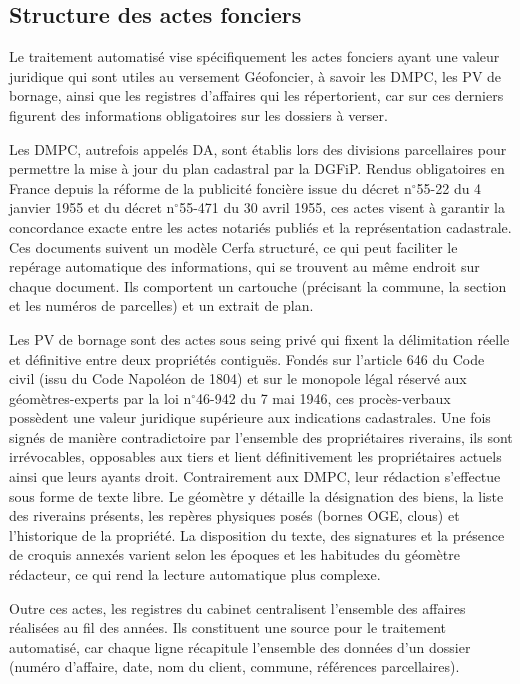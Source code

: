 \subsection{Structure des actes fonciers}

Le traitement automatisé vise spécifiquement les actes fonciers ayant une valeur juridique qui sont utiles au versement Géofoncier, à savoir les DMPC, les PV de bornage, ainsi que les registres d'affaires qui les répertorient, car sur ces derniers figurent des informations obligatoires sur les dossiers à verser.

Les DMPC, autrefois appelés DA, sont établis lors des divisions parcellaires pour permettre la mise à jour du plan cadastral par la DGFiP. Rendus obligatoires en France depuis la réforme de la publicité foncière issue du décret n$^\circ$55-22 du 4 janvier 1955 et du décret n$^\circ$55-471 du 30 avril 1955, ces actes visent à garantir la concordance exacte entre les actes notariés publiés et la représentation cadastrale. Ces documents suivent un modèle Cerfa structuré, ce qui peut faciliter le repérage automatique des informations, qui se trouvent au même endroit sur chaque document. Ils comportent un cartouche (précisant la commune, la section et les numéros de parcelles) et un extrait de plan. 

Les PV de bornage sont des actes sous seing privé qui fixent la délimitation réelle et définitive entre deux propriétés contiguës. Fondés sur l'article 646 du Code civil (issu du Code Napoléon de 1804) et sur le monopole légal réservé aux géomètres-experts par la loi n$^\circ$46-942 du 7 mai 1946, ces procès-verbaux possèdent une valeur juridique supérieure aux indications cadastrales. Une fois signés de manière contradictoire par l'ensemble des propriétaires riverains, ils sont irrévocables, opposables aux tiers et lient définitivement les propriétaires actuels ainsi que leurs ayants droit. Contrairement aux DMPC, leur rédaction s'effectue sous forme de texte libre. Le géomètre y détaille la désignation des biens, la liste des riverains présents, les repères physiques posés (bornes OGE, clous) et l'historique de la propriété. La disposition du texte, des signatures et la présence de croquis annexés varient selon les époques et les habitudes du géomètre rédacteur, ce qui rend la lecture automatique plus complexe.

Outre ces actes, les registres du cabinet centralisent l'ensemble des affaires réalisées au fil des années. Ils constituent une source pour le traitement automatisé, car chaque ligne récapitule l'ensemble des données d'un dossier (numéro d'affaire, date, nom du client, commune, références parcellaires).

